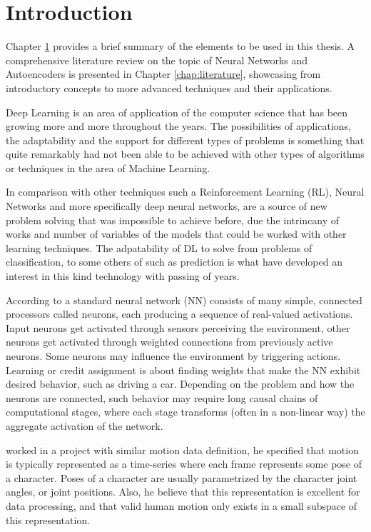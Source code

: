 \chapter{Introduction} \label{chap:introduction}
 Chapter \ref{chap:introduction} provides a brief summary of the elements to be used in this thesis. A comprehensive literature review on the topic of Neural Networks and Autoencoders is presented in Chapter \ref{chap:literature},
 showcasing from introductory concepts to more advanced techniques and their applications.

 Deep Learning is an area of application of the computer science that has been growing more and more throughout the years.
 The possibilities of applications, the adaptability and the support for different types of problems is something that quite remarkably 
 had not been able to be achieved with other types of algorithms or techniques in the area of Machine Learning.
 
 In comparison with other techniques such a Reinforcement Learning (RL), Neural Networks and more specifically deep neural networks,
 are a source of new problem solving that was impossible to achieve before, due the intrincany of works and number of variables 
 of the models that could be worked with other learning techniques. The adpatability of DL to solve from problems of classification, to some others of such as prediction is what 
 have developed an interest in this kind technology with passing of years. 
 
 According to \citet{Zeng:2008} a standard neural network (NN) consists of many simple, connected processors called neurons, each producing a sequence of real-valued activations. 
 Input neurons get activated through sensors perceiving the environment, other neurons get activated through weighted connections from previously active neurons. 
 Some neurons may influence the environment by triggering actions. Learning or credit assignment is about finding weights that make the NN exhibit desired behavior, 
 such as driving a car. Depending on the problem and how the neurons are connected, such behavior may require long causal chains of computational stages, 
 where each stage transforms (often in a non-linear way) the aggregate activation of the network.
  
 \citet{Holden:2014} worked in a project with similar motion data definition, he specified that motion is typically represented as a time-series where each frame 
 represents some pose of a character. Poses of a character are usually parametrized by the character joint angles, or joint positions. 
 Also, he believe that this representation is excellent for data processing, and that valid human motion only exists in a small subspace of this representation. 
 
